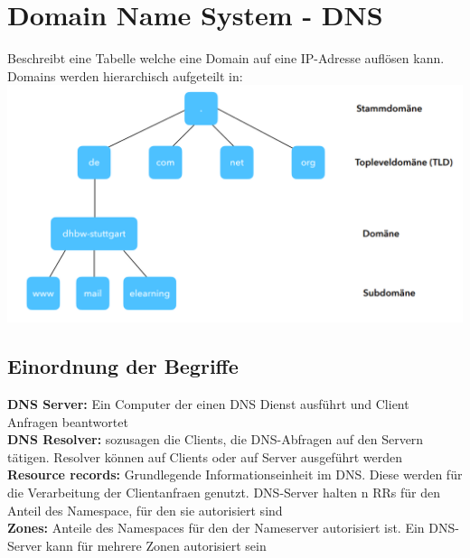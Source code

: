 \documentclass[12pt,a4paper]{article}
\begin{document}
\section{Domain Name System - DNS}
Beschreibt eine Tabelle welche eine Domain auf eine IP-Adresse auflösen kann. Domains werden hierarchisch aufgeteilt in:\\
\includegraphics[width=\textwidth]{Bilder/Domain.PNG}

\subsection{Einordnung der Begriffe}
\textbf{DNS Server:} Ein Computer der einen DNS Dienst ausführt und Client Anfragen beantwortet\\
\textbf{DNS Resolver:} sozusagen die Clients, die DNS-Abfragen auf den Servern tätigen. Resolver können auf Clients oder auf Server ausgeführt werden\\
\textbf{Resource records:} Grundlegende Informationseinheit im DNS. Diese werden für die Verarbeitung der Clientanfraen genutzt. DNS-Server halten n RRs für den Anteil des Namespace, für den sie autorisiert sind\\
\textbf{Zones:} Anteile des Namespaces für den der Nameserver autorisiert ist. Ein DNS-Server kann für mehrere Zonen autorisiert sein
\end{document}
